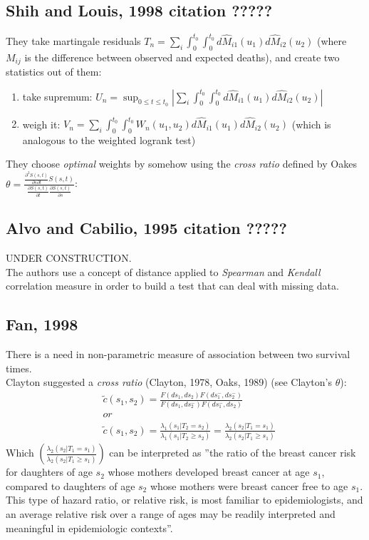 \documentclass[]{article}
\begin{document}
\subsection{Shih and Louis, 1998 citation ?????}
They take martingale residuals $T_n=\sum_i \int_0^{t_0}  \int_0^{t_0} d\hat{M}_{i1}(u_1) d\hat{M}_{i2}(u_2)$ (where $M_{ij}$ is the difference between observed and expected deaths), and create two statistics out of them:
\begin{enumerate}
	\item take supremum: $U_n= \sup_{0\leq t \leq t_0} \left|\sum_i \int_0^{t_0}  \int_0^{t_0} d\hat{M}_{i1}(u_1) d\hat{M}_{i2}(u_2)\right|$
	\item weigh it: $V_n= \sum_i \int_0^{t_0}  \int_0^{t_0} W_n(u_1,u_2) d\hat{M}_{i1}(u_1) d\hat{M}_{i2}(u_2)$ (which is analogous to the weighted logrank test)
\end{enumerate}
They choose \emph{optimal} weights by somehow using the \emph{cross ratio} defined by Oakes $\theta = \frac{ \frac{\partial^2 S(s,t)}{\partial s \partial t} S(s, t)}    {\frac{\partial S(s, t)}{\partial t} \frac{\partial S(s, t)}{\partial s}}$: 

\subsection{Alvo and Cabilio, 1995 citation ?????}
UNDER CONSTRUCTION.\\
The authors use a concept of distance applied to \emph{Spearman} and \emph{Kendall} correlation measure in order to build a test that can deal with missing data. 

\subsection{Fan, 1998 \cite{fan2000dependence}}
There is a need in non-parametric measure of association between two survival times.\\
Clayton suggested a \textit{cross ratio} (Clayton, 1978, Oaks, 1989) (see Clayton's $\theta$):
	$$
	\begin{aligned}
		&\tilde{c}(s_1, s_2) = \frac{F(ds_1, ds_2)F(ds_1^-, ds_2^-)} {F(ds_1, ds_2^-)F(ds_1^-, ds_2)} \\
		 &or\\
		 & \tilde{c}(s_1, s_2) = \frac{ \lambda_1(s_1|T_2=s_2)}{\lambda_1(s_1|T_2 \geq s_2)} = \frac{ \lambda_2(s_2|T_1=s_1)}{\lambda_2(s_2|T_1 \geq s_1)}
	\end{aligned}
	$$
Which $\left(\frac{ \lambda_2(s_2|T_1=s_1)}{\lambda_2(s_2|T_1 \geq s_1)}\right)$ can be interpreted as ''the ratio of the breast cancer risk for daughters of age $s_2$ whose mothers developed breast cancer at age $s_1$, compared to daughters of age $s_2$ whose mothers were breast cancer free to age $s_1$. This type of hazard ratio, or relative risk, is most familiar to epidemiologists, and an average relative risk over a range of ages may be readily interpreted and meaningful in epidemiologic contexts''.\\
\end{document}
